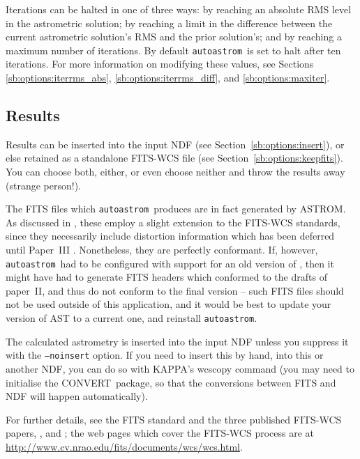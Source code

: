 \documentclass[twoside,11pt,nolof]{starlink}
\providecommand{\AST}{\xref{{\footnotesize AST}}{sun210}{}}
\providecommand{\ASTROM}{{\footnotesize ASTROM}\normalsize}
\providecommand{\autoastrom}{\texttt{autoastrom}}
\providecommand{\CONVERT}{{\footnotesize CONVERT}\normalsize}
\providecommand{\KAPPA}{{\footnotesize KAPPA}\normalsize}
\begin{document}
Iterations can be halted in one of three ways: by reaching an absolute RMS
level in the astrometric solution; by reaching a limit in the difference
between the current astrometric solution's RMS and the prior solution's; and
by reaching a maximum number of iterations. By default \autoastrom\ is set to
halt after ten iterations. For more information on modifying these values, see
Sections \ref{sb:options:iterrms_abs}, \ref{sb:options:iterrms_diff}, and
\ref{sb:options:maxiter}.

\subsection{Results\label{sb:results}}

Results can be inserted into the input NDF (see
Section~\ref{sb:options:insert}), or else retained as a standalone FITS-WCS
file (see Section~\ref{sb:options:keepfits}).  You can choose both, either, or
even choose neither and throw the results away (strange person!).

The FITS files which \autoastrom\ produces are in fact generated by \ASTROM.
As discussed in , these employ a slight extension to the FITS-WCS
standards, since they necessarily include distortion information which has
been deferred until Paper~III \cite{fitswcs3}.  Nonetheless, they are
perfectly conformant.  If, however, \autoastrom\ had to be configured with
support for an old version of \AST, then it might have had to generate FITS
headers which conformed to the drafts of paper~II, and thus do not conform to
the final version -- such FITS files should not be used outside of this
application, and it would be best to update your version of AST to a current
one, and reinstall \autoastrom.

The calculated astrometry is inserted into the input NDF unless you suppress
it with the \texttt{--noinsert} option.  If you need to insert this by hand,
into this or another NDF, you can do so with \KAPPA's wcscopy command (you may
need to initialise the \CONVERT\ package, so that the conversions between FITS
and NDF will happen automatically).

For further details, see the FITS standard \cite{nost-100-2} and the three
published FITS-WCS papers, \cite[FITS WCS Paper I]{fitswcs1}, \cite[FITS WCS
Paper II]{fitswcs2} and \cite[FITS WCS Paper III]{fitswcs3}; the web pages
which cover the FITS-WCS process are at
\url{http://www.cv.nrao.edu/fits/documents/wcs/wcs.html}.
\end{document}
